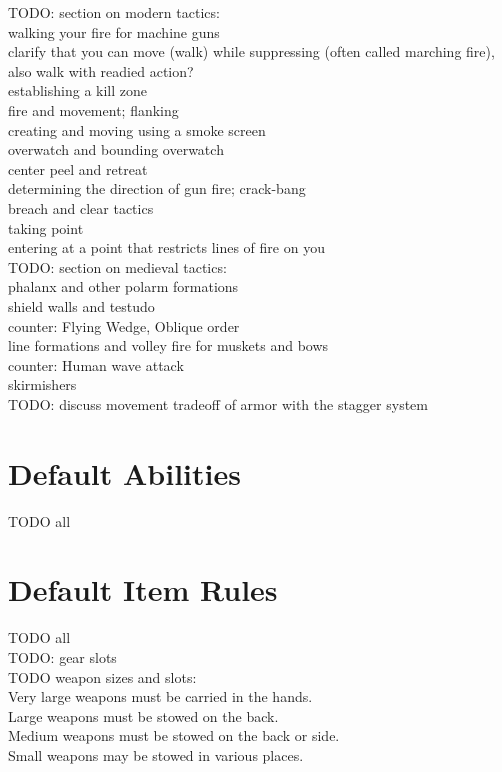 \documentclass[letterpaper,titlepage,openany,twocolumn]{book}
\begin{document}
TODO: section on modern tactics:\\
	walking your fire for machine guns\\
	clarify that you can move (walk) while suppressing (often called marching fire), also walk with readied action?\\
	establishing a kill zone\\
	fire and movement; flanking\\
	creating and moving using a smoke screen\\
	overwatch and bounding overwatch\\
	center peel and retreat\\
	determining the direction of gun fire; crack-bang\\
	breach and clear tactics\\
	taking point\\
	entering at a point that restricts lines of fire on you\\
TODO: section on medieval tactics:\\
	phalanx and other polarm formations\\
	shield walls and testudo\\
		counter: Flying Wedge, Oblique order\\
	line formations and volley fire for muskets and bows\\
		counter: Human wave attack\\
	skirmishers\\

TODO: discuss movement tradeoff of armor with the stagger system\\

\chapter{Default Abilities}
TODO all\\

\chapter{Default Item Rules}
TODO all\\
TODO: gear slots\\

TODO weapon sizes and slots:\\
	Very large weapons must be carried in the hands.\\
	Large weapons must be stowed on the back.\\
	Medium weapons must be stowed on the back or side.\\
	Small weapons may be stowed in various places.\\
\end{document}
